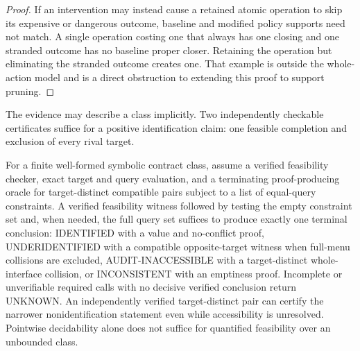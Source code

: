 \begin{proof}
If an intervention may instead cause a retained atomic operation to skip its expensive or dangerous outcome, baseline and modified policy supports need not match. A single operation costing one that always has one closing and one stranded outcome has no baseline proper closer. Retaining the operation but eliminating the stranded outcome creates one. That example is outside the whole-action model and is a direct obstruction to extending this proof to support pruning.

\end{proof}

The evidence may describe a class implicitly. Two independently checkable certificates suffice for a positive identification claim: one feasible completion and exclusion of every rival target.

\begin{theorem}\label{thm:t13}

For a finite well-formed symbolic contract class, assume a verified feasibility checker, exact target and query evaluation, and a terminating proof-producing oracle for target-distinct compatible pairs subject to a list of equal-query constraints. A verified feasibility witness followed by testing the empty constraint set and, when needed, the full query set suffices to produce exactly one terminal conclusion: IDENTIFIED with a value and no-conflict proof, UNDERIDENTIFIED with a compatible opposite-target witness when full-menu collisions are excluded, AUDIT-INACCESSIBLE with a target-distinct whole-interface collision, or INCONSISTENT with an emptiness proof. Incomplete or unverifiable required calls with no decisive verified conclusion return UNKNOWN. An independently verified target-distinct pair can certify the narrower nonidentification statement even while accessibility is unresolved. Pointwise decidability alone does not suffice for quantified feasibility over an unbounded class.

\end{theorem}

